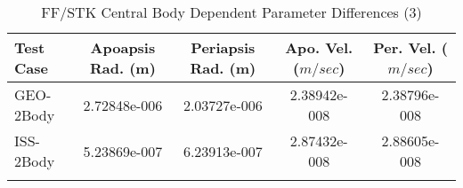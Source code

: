\begin{table}[htbp!]
\centering
\caption{ FF/STK Central Body Dependent Parameter Differences (3)}
      \begin{tabular}{lcccc}
      \hline\hline
          Test Case & Apoapsis Rad. (m) & Periapsis Rad. (m) & Apo. Vel. ($m/sec$) & Per. Vel. ($m/sec$) \\
         \hline
         GEO-2Body & 2.72848e-006 & 2.03727e-006 & 2.38942e-008 & 2.38796e-008 \\
         ISS-2Body & 5.23869e-007 & 6.23913e-007 & 2.87432e-008 & 2.88605e-008 \\
      \hline\hline
      \label{Table: FF-STK CB Parameters Set 3} 
\end{tabular}
\end{table}
